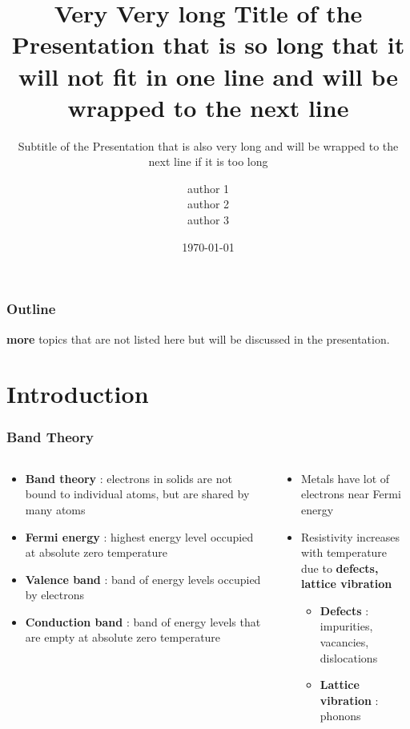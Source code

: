 \documentclass{beamer}
\title{Very Very long	Title of the Presentation that is so long that it will not fit in one line and will be wrapped to the next line}
\subtitle{Subtitle of the Presentation that is also very long and will be wrapped to the next line if it is too long}
\author{ author 1 \\ author 2 \\ author 3 \\ \vspace{0.5cm}}
\institute{Sample  University  \\ \vspace{1cm}
}
\date{\today}
\begin{document}
\begin{frame}[plain]
	\titlepage
\end{frame}

\begin{frame}
	\frametitle{Outline}
	\begin{tcolorbox}[colback=red!5!white,colframe=red!35!black,sharp corners=northwest ]
		\textbf{more} topics that are not listed here but will be discussed in the presentation.
	\end{tcolorbox}
\end{frame}

\section{Introduction}


\begin{frame}
	\frametitle{Band Theory}
	\begin{columns}
		\begin{column}{0.5\textwidth}
			\begin{itemize}
				\item \textbf{Band theory} : electrons in solids are not bound to individual atoms, but are shared by many atoms
				\item \textbf{Fermi energy} : highest energy level occupied at absolute zero temperature
				\item \textbf{Valence band} : band of energy levels occupied by electrons
				\item \textbf{Conduction band} : band of energy levels that are empty at absolute zero temperature
			\end{itemize}
		\end{column}
		\begin{column}{0.5\textwidth}
			\begin{itemize}
				\item Metals have lot of electrons near Fermi energy
				\item Resistivity increases with temperature \\
				      due to \textbf{defects, lattice vibration }
				\begin{itemize}
					\item \textbf{Defects} : impurities, vacancies, dislocations
					\item \textbf{Lattice vibration} : phonons
				\end{itemize}
			\end{itemize}
		\end{column}
	\end{columns}
\end{frame}
\end{document}

